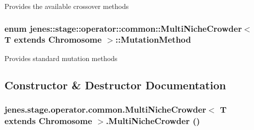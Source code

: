Provides the available crossover methods \hypertarget{classjenes_1_1stage_1_1operator_1_1common_1_1_multi_niche_crowder_3_01_t_01extends_01_chromosome_01_4_1ea23e3abc5ae7417a422840824bab65}{
\subsubsection[MutationMethod]{\setlength{\rightskip}{0pt plus 5cm}enum jenes::stage::operator::common::MultiNicheCrowder$<$ T extends Chromosome $>$::{\bf MutationMethod}}}
\label{classjenes_1_1stage_1_1operator_1_1common_1_1_multi_niche_crowder_3_01_t_01extends_01_chromosome_01_4_1ea23e3abc5ae7417a422840824bab65}


Provides standard mutation methods 

\subsection{Constructor \& Destructor Documentation}
\hypertarget{classjenes_1_1stage_1_1operator_1_1common_1_1_multi_niche_crowder_3_01_t_01extends_01_chromosome_01_4_0e3210ea1f2d3f1687f5c1f9a0f326dd}{
\subsubsection[MultiNicheCrowder]{\setlength{\rightskip}{0pt plus 5cm}jenes.stage.operator.common.MultiNicheCrowder$<$ T extends Chromosome $>$.MultiNicheCrowder ()}}
\label{classjenes_1_1stage_1_1operator_1_1common_1_1_multi_niche_crowder_3_01_t_01extends_01_chromosome_01_4_0e3210ea1f2d3f1687f5c1f9a0f326dd}


